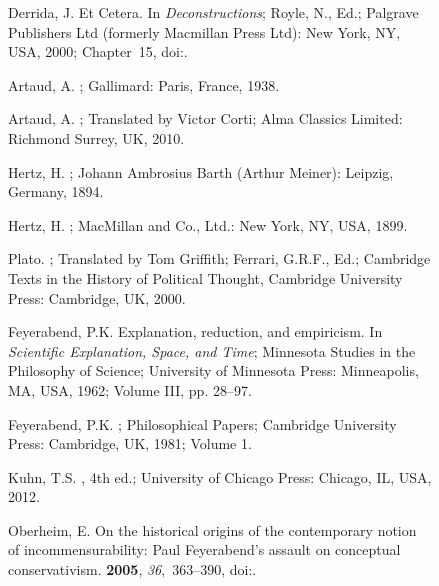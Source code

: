 \documentclass[entropy,article,accept,oneauthor,pdftex]{Definitions/mdpi}
\begin{document}
\begin{figure}[H]
\begin{thebibliography}{999}
Derrida, J.
\newblock Et Cetera. In {\em Deconstructions}; Royle, N., Ed.; Palgrave
  Publishers Ltd (formerly Macmillan Press Ltd): New York, NY, USA, 2000; Chapter~15, doi:{\href{https://doi.org/10.1007/978-1-137-06095-2_15}{}}.

Artaud, A.
; Gallimard: Paris, France, 1938.

Artaud, A.
; Translated by Victor Corti; Alma Classics Limited: Richmond Surrey, UK, 2010. %

Hertz, H.
; Johann Ambrosius Barth (Arthur Meiner): Leipzig, Germany, 1894.

Hertz, H.
; MacMillan and Co., Ltd.: New York, NY, USA, 1899.

Plato.
; Translated by Tom Griffith; Ferrari, G.R.F., Ed.; Cambridge Texts in the History of Political Thought, Cambridge University Press: Cambridge, UK, 2000.

Feyerabend, P.K.
\newblock Explanation, reduction, and empiricism. In {\em Scientific Explanation, Space, and Time}; Minnesota Studies in the Philosophy of Science; University of Minnesota Press: Minneapolis, MA, USA, 1962; Volume III, pp. 28--97.

Feyerabend, P.K.
; {P}hilosophical Papers; Cambridge University Press: Cambridge, UK, 1981; Volume 1.

Kuhn, T.S.
, 4th ed.; University of Chicago Press: Chicago, IL, USA, 2012.%

Oberheim, E.
\newblock On the historical origins of the contemporary notion of incommensurability: {P}aul {F}eyerabend's assault on conceptual conservativism.
 {\bf 2005}, {\em 36},~363--390, doi:{\href{https://doi.org/10.1016/j.shpsa.2005.04.003}{}}.


\end{thebibliography}
\end{figure}
\end{document}
